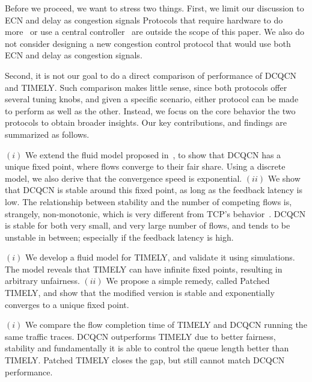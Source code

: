 
Before we proceed, we want to stress two things.  First, we limit our discussion
to ECN and delay as congestion signals  Protocols 
that require hardware to do more~\cite{pfabric,rcp,katabi2002congestion} or use a central
controller~\cite{perry2014fastpass,deadline} are outside the scope of this
paper. We also do not consider designing a new congestion control protocol that
would use both ECN and delay as congestion signals. 

Second, it is not our goal to do a direct comparison of performance of DCQCN and
TIMELY.  Such comparison makes little sense, since both protocols offer several
tuning knobs, and given a specific scenario, either protocol can be made to
perform as well as the other. Instead, we focus on the core behavior the two
protocols to obtain broader insights.  Our key contributions, and findings are
summarized as follows.

 $(i)$ We extend the fluid model proposed in~\cite{dcqcn}, to show
that DCQCN has a unique fixed point, where flows converge to their fair share.
Using a discrete model, we also derive that the convergence speed is exponential.
$(ii)$ We show that DCQCN is stable around this fixed point, as long as the
feedback latency is low. The relationship between stability and the number of
competing flows is, strangely, non-monotonic, which is very different from TCP's
behavior~\cite{misra:TAC2002}. DCQCN is stable for both very small, and very
large number of flows, and tends to be unstable in between; especially if the
feedback latency is high.

 $(i)$ We develop a fluid model for TIMELY, and validate it using
simulations. The model reveals that TIMELY can have infinite fixed points,
resulting in arbitrary unfairness.  $(ii)$ We propose a simple remedy, called Patched TIMELY, and show
that the modified version is stable and exponentially converges to a unique fixed 
point. 

 $(i)$ We compare the flow completion time of TIMELY and 
DCQCN running the same traffic traces. DCQCN outperforms TIMELY
due to better fairness, stability and fundamentally it is able to
control the queue length better than TIMELY. Patched TIMELY closes the gap, but 
still cannot match DCQCN performance. 

